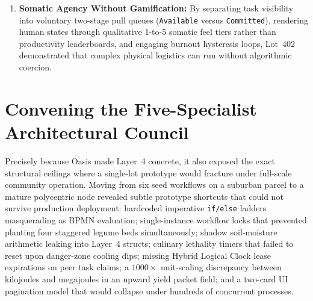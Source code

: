 \begin{enumerate}
        parameterized via JSON-LD catalogs (\texttt{fabaceae\_cultivars.jsonld}) across
        diverse nitrogen-fixing and soil-consuming cultivars, while physical transport
        enforces container invariants across liquids, granular particulates, and heavy
        discrete solids.
\item \textbf{Somatic Agency Without Gamification:} By separating task visibility into
        voluntary two-stage pull queues (\texttt{Available} versus \texttt{Committed}),
        rendering human states through qualitative 1-to-5 somatic feel tiers rather than
        productivity leaderboards, and engaging burnout hysteresis loops, Lot~402
        demonstrated that complex physical logistics can run without algorithmic coercion.
\end{enumerate}

\section*{Convening the Five-Specialist Architectural Council}

Precisely because Oasis made Layer~4 concrete, it also exposed the exact structural ceilings
where a single-lot prototype would fracture under full-scale community operation. Moving
from six seed workflows on a suburban parcel to a mature polycentric node revealed subtle
prototype shortcuts that could not survive production deployment: hardcoded imperative
\texttt{if/else} ladders masquerading as BPMN evaluation; single-instance workflow locks
that prevented planting four staggered legume beds simultaneously; shadow soil-moisture
arithmetic leaking into Layer~4 structs; culinary lethality timers that failed to reset upon
danger-zone cooling dips; missing Hybrid Logical Clock lease expirations on peer task
claims; a $1000\times$ unit-scaling discrepancy between kilojoules and megajoules in an
upward yield packet field; and a two-card UI pagination model that would collapse under
hundreds of concurrent processes.

